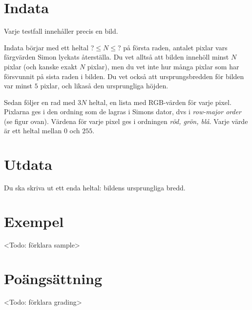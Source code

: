 \section*{Indata}
Varje testfall innehåller precis en bild.

Indata börjar med ett heltal ?$ \leq N \leq $? på första raden, antalet pixlar vars
färgvärden Simon lyckats återställa. Du vet alltså att bilden innehöll minst
$N$ pixlar (och kanske exakt $N$ pixlar), men du vet inte hur många pixlar som
har försvunnit på sista raden i bilden. Du vet också att ursprungsbredden för
bilden var minst $5$ pixlar, och likaså den ursprungliga höjden.

Sedan följer en rad med $3N$ heltal, en lista med RGB-värden för varje pixel.
Pixlarna ges i den ordning som de lagras i Simons dator, dvs i \emph{row-major
order} (se figur ovan). Värdena för varje pixel ges i ordningen \emph{röd,
grön, blå}. Varje värde är ett heltal mellan $0$ och $255$.

\section*{Utdata}
Du ska skriva ut ett enda heltal: bildens ursprungliga bredd.

\section*{Exempel}
<Todo: förklara sample>

\section*{Poängsättning}
<Todo: förklara grading>
